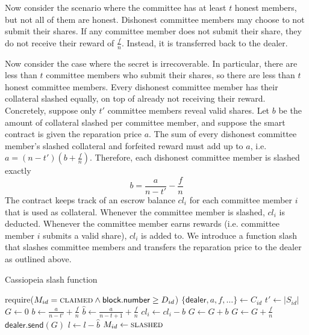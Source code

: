 Now consider the scenario where the committee has at least $t$ honest members, but not all of them are honest.
Dishonest committee members may choose to not submit their shares.
If any committee member does not submit their share, they do not receive their reward of $\frac{f}{n}$.
Instead, it is transferred back to the dealer.

Now consider the case where the secret is irrecoverable.
In particular, there are less than $t$ committee members who submit their shares, so there are less than $t$ honest committee members.
Every dishonest committee member has their collateral slashed equally, on top of already not receiving their reward.
Concretely, suppose only $t'$ committee members reveal valid shares.
Let $b$ be the amount of collateral slashed per committee member, and suppose the smart contract is given the reparation price $a$.
The sum of every dishonest committee member's slashed collateral and forfeited reward must add up to $a$, i.e. $a = (n - t')(b + \frac{f}{n})$.
Therefore, each dishonest committee member is slashed exactly
\begin{equation}\label{eq:slash_amount}
    b = \frac{a}{n - t'} - \frac{f}{n}
\end{equation}
The contract keeps track of an escrow balance $cl_i$ for each committee member $i$ that is used as collateral.
Whenever the committee member is slashed, $cl_i$ is deducted.
Whenever the committee member earns rewards (i.e. committee member $i$ submits a valid share), $cl_i$ is added to.
We introduce a function \textsf{slash} that slashes committee members and transfers the reparation price to the dealer as outlined above.

\begin{algorithm}[H]
\caption{Cassiopeia \textsf{slash} function}
\label{alg:slash}
    \begin{algorithmic}[1]
                \State require($M_{id} = \textsc{claimed} \land \textsf{block.number} \geq D_{id}$)
                \State $\{\textsf{dealer}, a, f, \dots\} \gets C_{id}$
                \State $t' \gets |S_{id}|$
                \State $G \gets 0$
                \State $b \gets \frac{a}{n - t'} + \frac{f}{n}$ 
                \State $\hat{b} \gets \frac{a}{n - t + 1} + \frac{f}{n}$ 
                            \State $cl_i \gets cl_i - b$
                            \State $G \gets G + b$
                        \EndIf
                        \State $G \gets G + \frac{f}{n}$
                    \EndIf
                \EndFor
                \State $\textsf{dealer.send}(G)$
                \State $l \gets l - \hat{b}$ 
                \State $M_{id} \gets \textsc{slashed}$
            \EndFunction
    \end{algorithmic}
\end{algorithm}

